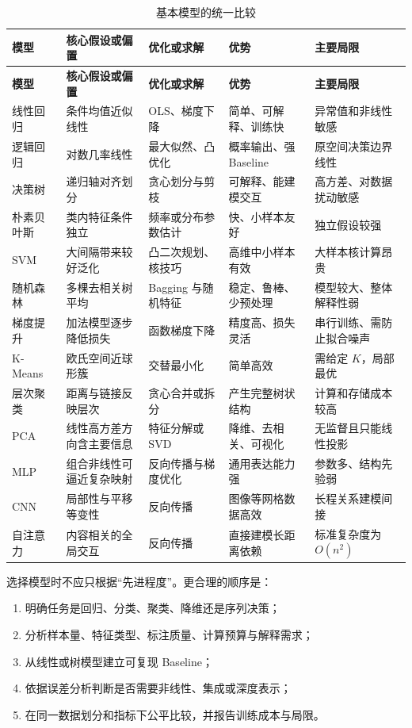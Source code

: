 \documentclass[UTF8,zihao=-4,a4paper,fontset=windows]{ctexart}
\begin{document}
\small
\begin{longtable}{L{2.1cm}L{2.45cm}L{2.75cm}L{2.75cm}L{3.1cm}}
\caption{基本模型的统一比较}\label{tab:model-compare}\\
\toprule
\textbf{模型} & \textbf{核心假设或偏置} & \textbf{优化或求解} &
\textbf{优势} & \textbf{主要局限}\\
\midrule
\endfirsthead
\toprule
\textbf{模型} & \textbf{核心假设或偏置} & \textbf{优化或求解} &
\textbf{优势} & \textbf{主要局限}\\
\midrule
\endhead
\bottomrule
\endfoot
线性回归 & 条件均值近似线性 & OLS、梯度下降 & 简单、可解释、训练快 & 异常值和非线性敏感\\
逻辑回归 & 对数几率线性 & 最大似然、凸优化 & 概率输出、强 Baseline & 原空间决策边界线性\\
决策树 & 递归轴对齐划分 & 贪心划分与剪枝 & 可解释、能建模交互 & 高方差、对数据扰动敏感\\
朴素贝叶斯 & 类内特征条件独立 & 频率或分布参数估计 & 快、小样本友好 & 独立假设较强\\
SVM & 大间隔带来较好泛化 & 凸二次规划、核技巧 & 高维中小样本有效 & 大样本核计算昂贵\\
随机森林 & 多棵去相关树平均 & Bagging 与随机特征 & 稳定、鲁棒、少预处理 & 模型较大、整体解释性弱\\
梯度提升 & 加法模型逐步降低损失 & 函数梯度下降 & 精度高、损失灵活 & 串行训练、需防止拟合噪声\\
K-Means & 欧氏空间近球形簇 & 交替最小化 & 简单高效 & 需给定 $K$，局部最优\\
层次聚类 & 距离与链接反映层次 & 贪心合并或拆分 & 产生完整树状结构 & 计算和存储成本较高\\
PCA & 线性高方差方向含主要信息 & 特征分解或 SVD & 降维、去相关、可视化 & 无监督且只能线性投影\\
MLP & 组合非线性可逼近复杂映射 & 反向传播与梯度优化 & 通用表达能力强 & 参数多、结构先验弱\\
CNN & 局部性与平移等变性 & 反向传播 & 图像等网格数据高效 & 长程关系建模间接\\
自注意力 & 内容相关的全局交互 & 反向传播 & 直接建模长距离依赖 & 标准复杂度为 $O(n^2)$\\
\end{longtable}
\normalsize

选择模型时不应只根据“先进程度”。更合理的顺序是：
\begin{enumerate}
  \item 明确任务是回归、分类、聚类、降维还是序列决策；
  \item 分析样本量、特征类型、标注质量、计算预算与解释需求；
  \item 从线性或树模型建立可复现 Baseline；
  \item 依据误差分析判断是否需要非线性、集成或深度表示；
  \item 在同一数据划分和指标下公平比较，并报告训练成本与局限。
\end{enumerate}
\end{document}
